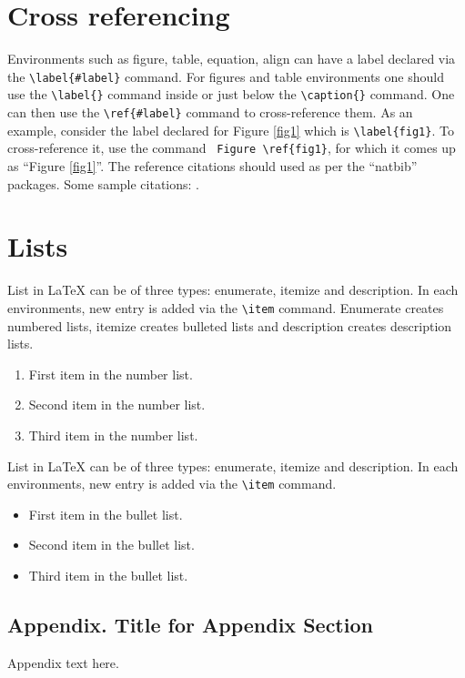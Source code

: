 \documentclass[journal=eds]{CAM-MODERN}%
\theoremstyle{definition}
\numberwithin{equation}{section}
\begin{document}
\section{Cross referencing}

Environments such as figure, table, equation, align can have a label
declared via the \verb+\label{#label}+ command. For figures and table
environments one should use the \verb+\label{}+ command inside or just
below the \verb+\caption{}+ command.  One can then use the
\verb+\ref{#label}+ command to cross-reference them. As an example, consider
the label declared for Figure \ref{fig1} which is
\verb+\label{fig1}+. To cross-reference it, use the command
\verb+ Figure \ref{fig1}+, for which it comes up as
``Figure \ref{fig1}''.
The reference citations should used as per the ``natbib'' packages. Some sample citations:  \citep{sellers_global_1969}.

\section{Lists}

List in \LaTeX{} can be of three types: enumerate, itemize and description.
In each environments, new entry is added via the \verb+\item+ command.
Enumerate creates numbered lists, itemize creates bulleted lists and
description creates description lists.
\begin{enumerate}
\item First item in the number list.
\item Second item in the number list.
\item Third item in the number list.
\end{enumerate}
List in \LaTeX{} can be of three types: enumerate, itemize and description.
In each environments, new entry is added via the \verb+\item+ command.
\begin{itemize}
\item First item in the bullet list.
\item Second item in the bullet list.
\item Third item in the bullet list.
\end{itemize}

\begin{appendix}
\section{Appendix. Title for Appendix Section}\label{appendixA}
Appendix text here.
\end{appendix}
\end{document}
